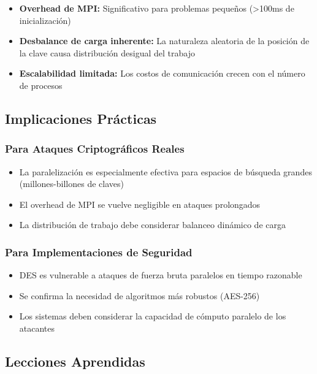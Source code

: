 \documentclass[12pt,letterpaper]{article}
\begin{document}
\begin{itemize}
    \item \textbf{Overhead de MPI:} Significativo para problemas pequeños (>100ms de inicialización)
    \item \textbf{Desbalance de carga inherente:} La naturaleza aleatoria de la posición de la clave causa distribución desigual del trabajo
    \item \textbf{Escalabilidad limitada:} Los costos de comunicación crecen con el número de procesos
\end{itemize}

\subsection{Implicaciones Prácticas}

\subsubsection{Para Ataques Criptográficos Reales}

\begin{itemize}
    \item La paralelización es especialmente efectiva para espacios de búsqueda grandes (millones-billones de claves)
    \item El overhead de MPI se vuelve negligible en ataques prolongados
    \item La distribución de trabajo debe considerar balanceo dinámico de carga
\end{itemize}

\subsubsection{Para Implementaciones de Seguridad}

\begin{itemize}
    \item DES es vulnerable a ataques de fuerza bruta paralelos en tiempo razonable
    \item Se confirma la necesidad de algoritmos más robustos (AES-256)
    \item Los sistemas deben considerar la capacidad de cómputo paralelo de los atacantes
\end{itemize}

\subsection{Lecciones Aprendidas}
\end{document}
